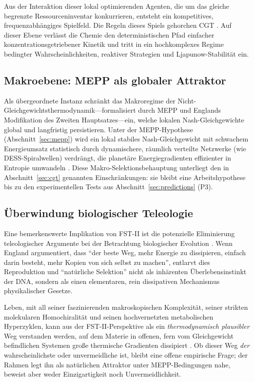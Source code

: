 \documentclass[12pt,a4paper]{article}
\theoremstyle{remark}
\begin{document}
Aus der Interaktion dieser lokal optimierenden Agenten, die um das gleiche begrenzte Ressourceninventar konkurrieren, entsteht ein kompetitives, frequenzabh\"angiges Spielfeld. Die Regeln dieses Spiels gehorchen CGT \citep{AzoarcusPNAS}. Auf dieser Ebene verl\"asst die Chemie den deterministischen Pfad einfacher konzentrationsgetriebener Kinetik und tritt in ein hochkomplexes Regime bedingter Wahrscheinlichkeiten, reaktiver Strategien und Ljapunow-Stabilit\"at ein.

\subsection{Makroebene: MEPP als globaler Attraktor}

Als \"ubergeordnete Instanz schr\"ankt das Makroregime der Nicht-Gleichgewichtsthermodynamik---formalisiert durch MEPP und Englands Modifikation des Zweiten Hauptsatzes---ein, welche lokalen Nash-Gleichgewichte global und langfristig persistieren. Unter der MEPP-Hypothese (Abschnitt~\ref{sec:mepp}) wird ein lokal stabiles Nash-Gleichgewicht mit schwachem Energieumsatz statistisch durch dynamischere, r\"aumlich verteilte Netzwerke (wie DESS-Spiralwellen) verdr\"angt, die planet\"are Energiegradienten effizienter in Entropie umwandeln \citep{EntropyMEPP}. Diese Makro-Selektionsbehauptung unterliegt den in Abschnitt~\ref{sec:cgt} genannten Einschr\"ankungen: sie bleibt eine Arbeitshypothese bis zu den experimentellen Tests aus Abschnitt~\ref{sec:predictions} (P3).

\subsection{\"Uberwindung biologischer Teleologie}

Eine bemerkenswerte Implikation von FST-II ist die potenzielle Eliminierung teleologischer Argumente bei der Betrachtung biologischer Evolution \citep{UnbecomingBeing}. Wenn England argumentiert, dass ``der beste Weg, mehr Energie zu dissipieren, einfach darin besteht, mehr Kopien von sich selbst zu machen'', entlarvt dies Reproduktion und ``nat\"urliche Selektion'' nicht als inh\"arenten \"Uberlebensinstinkt der DNA, sondern als einen elementaren, rein dissipativen Mechanismus physikalischer Gesetze.

Leben, mit all seiner faszinierenden makroskopischen Komplexit\"at, seiner strikten molekularen Homochiralit\"at und seinen hochvernetzten metabolischen Hyperzyklen, kann aus der FST-II-Perspektive als ein \emph{thermodynamisch plausibler} Weg verstanden werden, auf dem Materie in offenen, fern vom Gleichgewicht befindlichen Systemen gro\ss{}e thermische Gradienten dissipiert \citep{Bioenergetics}. Ob dieser Weg \emph{der} wahrscheinlichste oder unvermeidliche ist, bleibt eine offene empirische Frage; der Rahmen legt ihn als nat\"urlichen Attraktor unter MEPP-Bedingungen nahe, beweist aber weder Einzigartigkeit noch Unvermeidlichkeit.
\end{document}
